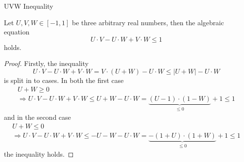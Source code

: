 \begin{lemma}
\label{lemma:UVW}
UVW Inequality

Let $U,V,W\in[-1,1]$ be three arbitrary real numbers, then the algebraic equation
\begin{equation}
U\cdot V-U\cdot W+V\cdot W
\leq1
\end{equation}
holds.

\begin{proof}
Firstly, the inequality
\begin{equation}
U\cdot V-U\cdot W+V\cdot W
=V\cdot(U+W)-U\cdot W
\leq |U+W|-U\cdot W
\end{equation}
is split in to cases.
In both the first case
\begin{multline}
U+W
\geq0
\\
\Rightarrow
U\cdot V-U\cdot W+V\cdot W
\leq U+W-U\cdot W
=\underbrace{(U-1)\cdot(1-W)}_{\leq0}+1
\leq1
\end{multline}
and in the second case
\begin{multline}
U+W
\leq0
\\
\Rightarrow
U\cdot V-U\cdot W+V\cdot W
\leq -U-W-U\cdot W
=\underbrace{-(1+U)\cdot(1+W)}_{\leq0}+1
\leq1
\end{multline}
the inequality holds.
\end{proof}
\end{lemma}

